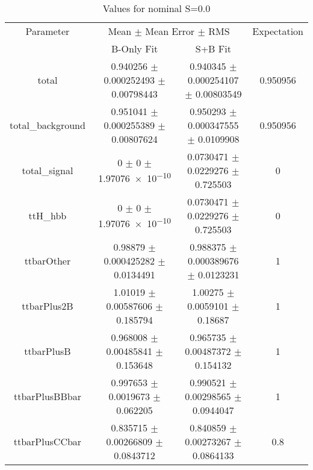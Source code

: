 \begin{table}
\centering
\caption{Values for nominal S=0.0}
\begin{tabular}{cccc}
\toprule
Parameter & \multicolumn{2}{c}{Mean $\pm$ Mean Error $\pm$ RMS} & Expectation\\
 & B-Only Fit & S+B Fit & \\
\midrule
total & \num{0.940256} $\pm$ \num{0.000252493} $\pm$ \num{0.00798443} & \num{0.940345} $\pm$ \num{0.000254107} $\pm$ \num{0.00803549} & \num{0.950956}\\
total\_background & \num{0.951041} $\pm$ \num{0.000255389} $\pm$ \num{0.00807624} & \num{0.950293} $\pm$ \num{0.000347555} $\pm$ \num{0.0109908} & \num{0.950956}\\
total\_signal & \num{0} $\pm$ \num{0} $\pm$ \num{1.97076e-10} & \num{0.0730471} $\pm$ \num{0.0229276} $\pm$ \num{0.725503} & \num{0}\\
ttH\_hbb & \num{0} $\pm$ \num{0} $\pm$ \num{1.97076e-10} & \num{0.0730471} $\pm$ \num{0.0229276} $\pm$ \num{0.725503} & \num{0}\\
ttbarOther & \num{0.98879} $\pm$ \num{0.000425282} $\pm$ \num{0.0134491} & \num{0.988375} $\pm$ \num{0.000389676} $\pm$ \num{0.0123231} & \num{1}\\
ttbarPlus2B & \num{1.01019} $\pm$ \num{0.00587606} $\pm$ \num{0.185794} & \num{1.00275} $\pm$ \num{0.0059101} $\pm$ \num{0.18687} & \num{1}\\
ttbarPlusB & \num{0.968008} $\pm$ \num{0.00485841} $\pm$ \num{0.153648} & \num{0.965735} $\pm$ \num{0.00487372} $\pm$ \num{0.154132} & \num{1}\\
ttbarPlusBBbar & \num{0.997653} $\pm$ \num{0.0019673} $\pm$ \num{0.062205} & \num{0.990521} $\pm$ \num{0.00298565} $\pm$ \num{0.0944047} & \num{1}\\
ttbarPlusCCbar & \num{0.835715} $\pm$ \num{0.00266809} $\pm$ \num{0.0843712} & \num{0.840859} $\pm$ \num{0.00273267} $\pm$ \num{0.0864133} & \num{0.8}\\
\bottomrule
\end{tabular}
\end{table}